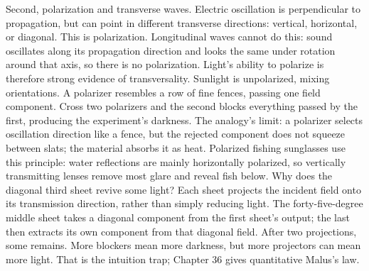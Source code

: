 \begin{mainline}
Second, polarization and transverse waves. Electric oscillation is perpendicular to propagation, but can point in different transverse directions: vertical, horizontal, or diagonal. This is polarization. Longitudinal waves cannot do this: sound oscillates along its propagation direction and looks the same under rotation around that axis, so there is no polarization. Light's ability to polarize is therefore strong evidence of transversality. Sunlight is unpolarized, mixing orientations. A polarizer resembles a row of fine fences, passing one field component. Cross two polarizers and the second blocks everything passed by the first, producing the experiment's darkness. The analogy's limit: a polarizer selects oscillation direction like a fence, but the rejected component does not squeeze between slats; the material absorbs it as heat. Polarized fishing sunglasses use this principle: water reflections are mainly horizontally polarized, so vertically transmitting lenses remove most glare and reveal fish below. Why does the diagonal third sheet revive some light? Each sheet projects the incident field onto its transmission direction, rather than simply reducing light. The forty-five-degree middle sheet takes a diagonal component from the first sheet's output; the last then extracts its own component from that diagonal field. After two projections, some remains. More blockers mean more darkness, but more projectors can mean more light. That is the intuition trap; Chapter 36 gives quantitative Malus's law.
\end{mainline}


